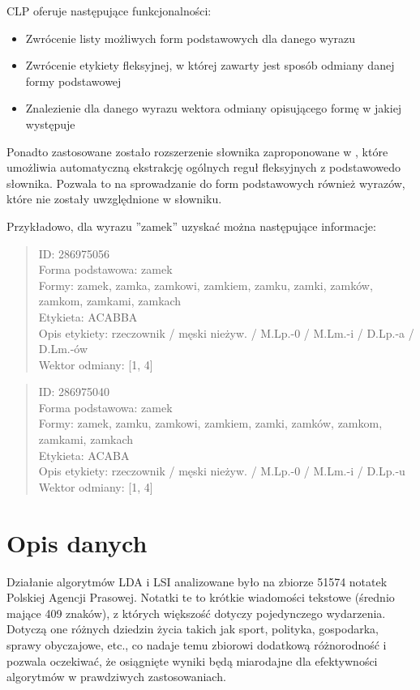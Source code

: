 \documentclass[11pt,a4paper]{article}
\begin{document}
CLP oferuje następujące funkcjonalności:
\begin{itemize}
\item Zwrócenie listy możliwych form podstawowych dla danego wyrazu
\item Zwrócenie etykiety fleksyjnej, w której zawarty jest sposób odmiany
danej formy podstawowej
\item Znalezienie dla danego wyrazu wektora odmiany opisującego formę
w jakiej występuje
\end{itemize}

Ponadto zastosowane zostało rozszerzenie słownika zaproponowane w
\cite{korzycki-stemmer}, które umożliwia automatyczną ekstrakcję ogólnych reguł
fleksyjnych z podstawowedo słownika.  Pozwala to na sprowadzanie do form
podstawowych również wyrazów, które nie zostały uwzględnione w słowniku.

Przykładowo, dla wyrazu ''zamek'' uzyskać można następujące informacje:

\begin{quote}
ID: 286975056\\
Forma podstawowa: zamek\\
Formy: zamek, zamka, zamkowi, zamkiem, zamku, zamki, zamków, zamkom, zamkami,
zamkach\\
Etykieta: ACABBA\\
Opis etykiety: rzeczownik / męski nieżyw. / M.Lp.-0 / M.Lm.-i / D.Lp.-a /
D.Lm.-ów\\
Wektor odmiany: [1, 4]\\
\end{quote}

\begin{quote}
ID: 286975040\\
Forma podstawowa: zamek\\
Formy: zamek, zamku, zamkowi, zamkiem, zamki, zamków, zamkom, zamkami,
zamkach\\
Etykieta: ACABA\\
Opis etykiety: rzeczownik / męski nieżyw. / M.Lp.-0 / M.Lm.-i / D.Lp.-u\\
Wektor odmiany: [1, 4]\\
\end{quote}
\section{Opis danych}
\label{data-description}

Działanie algorytmów LDA i LSI analizowane było na zbiorze 51574 notatek
Polskiej Agencji Prasowej. Notatki te to krótkie wiadomości tekstowe (średnio
mające 409 znaków), z których większość dotyczy pojedynczego wydarzenia.
Dotyczą one różnych dziedzin życia takich jak sport, polityka, gospodarka,
sprawy obyczajowe, etc., co nadaje temu zbiorowi dodatkową różnorodność i
pozwala oczekiwać, że osiągnięte wyniki będą miarodajne dla efektywności
algorytmów w prawdziwych zastosowaniach.
\end{document}
